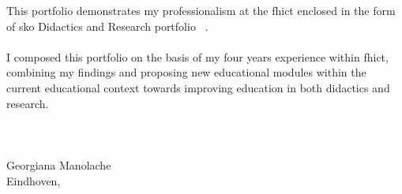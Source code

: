 This portfolio demonstrates my professionalism at the \acrfull{fhict} enclosed in the form of \acrfull{sko} Didactics and Research portfolio~\cite{FKO} .\\\\
I composed this portfolio on the basis of my four years experience within \acrshort{fhict}, combining my findings and proposing new educational modules within the current educational context towards improving education in both didactics and research.
\\\\
\\\\
Georgiana Manolache\\
Eindhoven,\\
